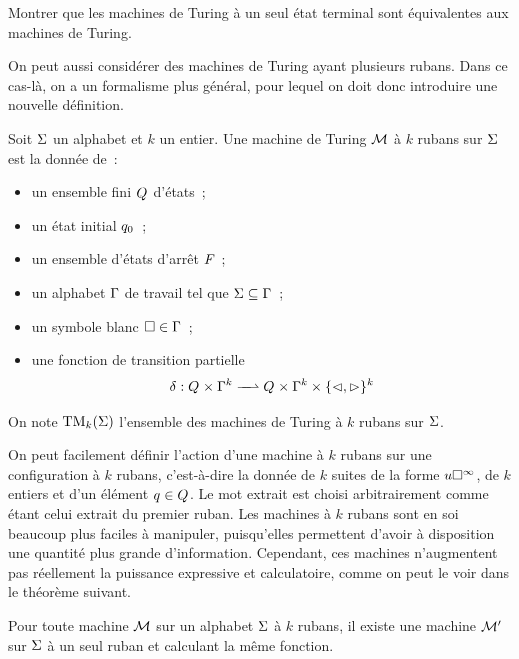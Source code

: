 \begin{exercise}
  Montrer que les machines de Turing à un seul état terminal sont équivalentes
  aux machines de Turing.
\end{exercise}

On peut aussi considérer des machines de Turing ayant plusieurs rubans. Dans
ce cas-là, on a un formalisme plus général, pour lequel on doit donc
introduire une nouvelle définition.

\begin{definition}
  Soit $\Sigma$ un alphabet et $k$ un entier. Une machine de Turing $\mathcal{M}$ 
  à $k$ rubans sur $\Sigma$ est la donnée de~:
  \begin{itemize}
  \item un ensemble fini $Q_{}$ d'états~;
  \item un état initial $q_{0}$~;
  \item un ensemble d'états d'arrêt $F_{}$~;
  \item un alphabet $\Gamma$ de travail tel que $\Sigma\subseteq\Gamma$~;
  \item un symbole blanc $\square\in\Gamma$~;
  \item une fonction de transition partielle
    \[\makeFunNamePartial{\trA}{\varQQ\times\ABB^k}
                         {\varQQ\times\ABB^k\times\{\lTr,\rTr\}^k}\]
  \end{itemize}
  On note $\operatorname{TM}_k(\Sigma)$ l'ensemble des machines de Turing à $k$ rubans sur
  $\Sigma$.
\end{definition}

On peut facilement définir l'action d'une machine à $k$ rubans sur une
configuration à $k$ rubans, c'est-à-dire la donnée de $k$ suites de la
forme $u\square^{\infty}$, de $k$ entiers et d'un élément $q_{} \in Q_{}$.
Le mot extrait est choisi arbitrairement comme étant celui extrait du
premier ruban. Les machines à $k$ rubans sont en soi beaucoup plus
faciles à manipuler, puisqu'elles permettent d'avoir à disposition une
quantité plus grande d'information. Cependant, ces machines n'augmentent pas
réellement la puissance expressive et calculatoire, comme on peut le voir dans
le théorème suivant.

\begin{theorem}
  Pour toute machine $\mathcal{M}$ sur un alphabet $\Sigma$ à $k$ rubans, il existe
  une machine $\mathcal{M}'$ sur $\Sigma$ à un seul ruban et calculant la même
  fonction.
\end{theorem}

